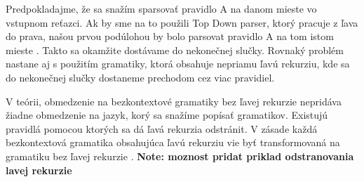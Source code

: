 Predpokladajme, že sa snažím sparsovať pravidlo A na danom mieste vo vstupnom reťazci. Ak by sme na to použili Top Down parser, ktorý pracuje z ľava do prava, našou prvou podúlohou by bolo parsovat pravidlo A na tom istom mieste \cite{moore2000removing}. Takto sa okamžite dostávame do nekonečnej slučky. Rovnaký problém nastane aj s použitím gramatiky, ktorá obsahuje nepriamu ľavú rekurziu, kde sa do nekonečnej slučky dostaneme prechodom cez viac pravidiel.

V teórii, obmedzenie na bezkontextové gramatiky bez ľavej rekurzie nepridáva žiadne obmedzenie na jazyk, korý sa snažíme popísať gramatikov. Existujú pravidlá pomocou ktorých sa dá ľavá rekurzia odstránit. V zásade každá bezkontextová gramatika obsahujúca ľavú rekurziu vie byť transformovaná na gramatiku bez ľavej rekurzie \cite{moore2000removing}.
\textbf{Note: moznost pridat priklad odstranovania lavej rekurzie}
